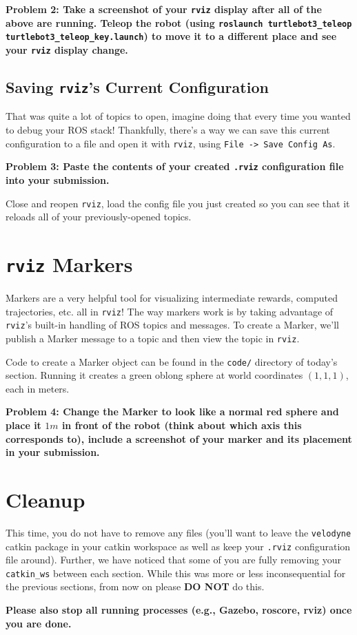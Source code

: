 \documentclass{article}
\begin{document}
{\bf Problem 2: Take a screenshot of your \texttt{rviz} display after all of the above are running. Teleop the robot (using \texttt{roslaunch turtlebot3\_teleop turtlebot3\_teleop\_key.launch}) to move it to a different place and see your \texttt{rviz} display change.}

\subsection{Saving \texttt{rviz}'s Current Configuration}

That was quite a lot of topics to open, imagine doing that every time you wanted to debug your ROS stack! Thankfully, there's a way we can save this current configuration to a file and open it with \texttt{rviz}, using \texttt{File -> Save Config As}. 

{\bf Problem 3: Paste the contents of your created \texttt{.rviz} configuration file into your submission.}

Close and reopen \texttt{rviz}, load the config file you just created so you can see that it reloads all of your previously-opened topics.

\section{\texttt{rviz} Markers}

Markers are a very helpful tool for visualizing intermediate rewards, computed trajectories, etc. all in \texttt{rviz}! The way markers work is by taking advantage of \texttt{rviz}'s built-in handling of ROS topics and messages. To create a Marker, we'll publish a Marker message to a topic and then view the topic in \texttt{rviz}.

Code to create a Marker object can be found in the \texttt{code/} directory of today's section. Running it creates a green oblong sphere at world coordinates $(1, 1, 1)$, each in meters.

{\bf Problem 4: Change the Marker to look like a normal red sphere and place it $1m$ in front of the robot (think about which axis this corresponds to), include a screenshot of your marker and its placement in your submission.}

\section{Cleanup}

This time, you do not have to remove any files (you'll want to leave the \texttt{velodyne} catkin package in your catkin workspace as well as keep your \texttt{.rviz} configuration file around). Further, we have noticed that some of you are fully removing your \texttt{catkin\_ws} between each section. While this was more or less inconsequential for the previous sections, from now on please \textbf{DO NOT} do this. 

\textbf{Please also stop all running processes (e.g., Gazebo, roscore, rviz) once you are done.}
\end{document}
